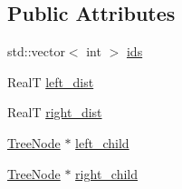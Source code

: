 \subsection*{Public Attributes}
\begin{DoxyCompactItemize}
\item 
std\+::vector$<$ int $>$ \hyperlink{struct_c_o_n_t_r_a_l_i_g_n_1_1_tree_1_1_tree_node_af0ba8bc52781c6857f116f17f8c5ca14}{ids}
\item 
Real\+T \hyperlink{struct_c_o_n_t_r_a_l_i_g_n_1_1_tree_1_1_tree_node_a0ab61d516eb4bba0c92d77f793e22103}{left\+\_\+dist}
\item 
Real\+T \hyperlink{struct_c_o_n_t_r_a_l_i_g_n_1_1_tree_1_1_tree_node_ab216db550a42f2a12765635b113d07b4}{right\+\_\+dist}
\item 
\hyperlink{struct_c_o_n_t_r_a_l_i_g_n_1_1_tree_1_1_tree_node}{Tree\+Node} $\ast$ \hyperlink{struct_c_o_n_t_r_a_l_i_g_n_1_1_tree_1_1_tree_node_acf53eb4bc788a05fa2f53d61ec7384e9}{left\+\_\+child}
\item 
\hyperlink{struct_c_o_n_t_r_a_l_i_g_n_1_1_tree_1_1_tree_node}{Tree\+Node} $\ast$ \hyperlink{struct_c_o_n_t_r_a_l_i_g_n_1_1_tree_1_1_tree_node_a89df07cf7699c58d8b4ef594322a0e1a}{right\+\_\+child}
\end{DoxyCompactItemize}


